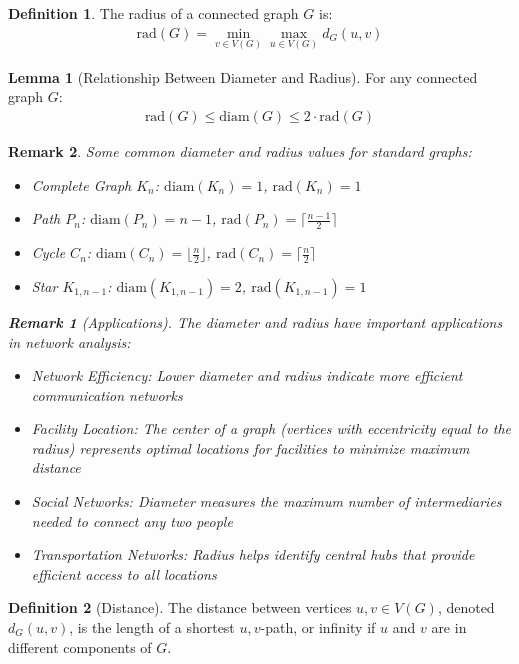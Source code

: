 \documentclass{article}
\newtheorem{remark}{Remark}
\theoremstyle{definition}
\newtheorem{lemma}{Lemma}
\newtheorem{definition}{Definition}
\begin{document}
\begin{definition}
The radius of a connected graph $G$ is:
\begin{align*}
\text{rad}(G) = \min_{v \in V(G)} \max_{u \in V(G)} d_G(u,v)
\end{align*}
\end{definition}


\begin{lemma}[Relationship Between Diameter and Radius]
For any connected graph $G$:
\begin{align*}
\text{rad}(G) \leq \text{diam}(G) \leq 2 \cdot \text{rad}(G)
\end{align*}
\end{lemma}

\begin{remark}
Some common diameter and radius values for standard graphs:
\begin{itemize}
    \item Complete Graph $K_n$: $\text{diam}(K_n) = 1$, $\text{rad}(K_n) = 1$
    \item Path $P_n$: $\text{diam}(P_n) = n-1$, $\text{rad}(P_n) = \lceil\frac{n-1}{2}\rceil$
    \item Cycle $C_n$: $\text{diam}(C_n) = \lfloor\frac{n}{2}\rfloor$, $\text{rad}(C_n) = \lceil\frac{n}{2}\rceil$
    \item Star $K_{1,n-1}$: $\text{diam}(K_{1,n-1}) = 2$, $\text{rad}(K_{1,n-1}) = 1$
\end{itemize}
\begin{remark}[Applications]
The diameter and radius have important applications in network analysis:
\begin{itemize}
    \item Network Efficiency: Lower diameter and radius indicate more efficient communication networks
    \item Facility Location: The center of a graph (vertices with eccentricity equal to the radius) represents optimal locations for facilities to minimize maximum distance
    \item Social Networks: Diameter measures the maximum number of intermediaries needed to connect any two people
    \item Transportation Networks: Radius helps identify central hubs that provide efficient access to all locations
\end{itemize}
\end{remark}
\end{remark}

\begin{definition}[Distance]
The distance between vertices $u, v \in V(G)$, denoted $d_G(u,v)$, is the length of a shortest $u,v$-path, or infinity if $u$ and $v$ are in different components of $G$.
\end{definition}
\end{document}
